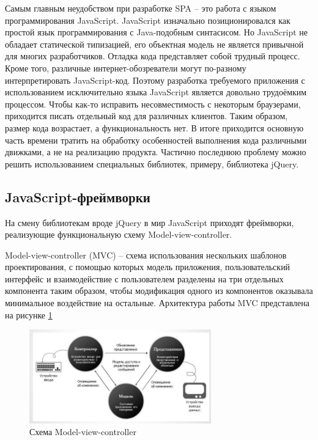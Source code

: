 Самым главным неудобством при разработке SPA -- это работа с языком программирования JavaScript. JavaScript изначально позиционировался как простой язык программирования с Java-подобным синтасисом. Но  JavaScript не обладает статической типизацией, его объектная модель не является привычной для многих разработчиков. Отладка кода представляет собой трудный процесс. Кроме того, различные интернет-обозреватели могут по-разному интерпретировать JavaScript-код. Поэтому разработка требуемого приложения с использованием исключительно языка JavaScript является довольно трудоёмким процессом. Чтобы как-то исправить несовместимость с некоторым браузерами, приходится писать отдельный код для различных клиентов. Таким образом, размер кода возрастает, а функциональность нет. В итоге приходится основную часть времени тратить на обработку особенностей выполнения кода различными движками, а не на реализацию продукта. Частично последнюю проблему можно решить использованием специальных библиотек, примеру, библиотека jQuery.  


\subsection {JavaScript-фреймворки}

На смену библиотекам вроде jQuery в мир JavaScript приходят фреймворки, реализующие функциональную схему Model-view-controller. 

Model-view-controller (MVC) -- схема использования нескольких шаблонов проектирования, с помощью которых модель приложения, пользовательский интерфейс и взаимодействие с пользователем разделены на три отдельных компонента таким образом, чтобы модификация одного из компонентов оказывала минимальное воздействие на остальные. Архитектура работы MVC представлена на рисунке \ref{mvc}

\begin{figure}[ht]

\center\includegraphics[width=0.7\textwidth]{mvc}

\caption{Схема Model-view-controller}\label{mvc}

\end{figure}


